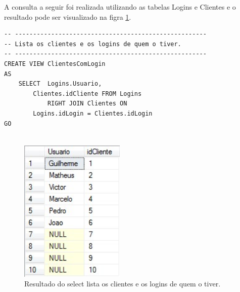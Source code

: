 \documentclass[
	12pt,				%
	openright,			%
	oneside,			%
	a4paper,			%
	chapter=TITLE,		%
	section=TITLE,		%
	english,			%
	brazil				%
	]{abntex2}
\begin{document}
    A consulta a seguir foi realizada utilizando as tabelas Logins e Clientes  
    e o resultado pode ser visualizado na figra \ref{select03}.
    \begin{lstlisting}
-- -----------------------------------------------------
-- Lista os clientes e os logins de quem o tiver.
-- -----------------------------------------------------
CREATE VIEW ClientesComLogin
AS
	SELECT  Logins.Usuario, 
    	Clientes.idCliente FROM Logins
	    	RIGHT JOIN Clientes ON 
    	Logins.idLogin = Clientes.idLogin 
GO
    
    \end{lstlisting}
    \begin{figure}[h]
         \centering
         \includegraphics[width=5cm,keepaspectratio]{Imgs/Select_003}
         \caption{Resultado do select lista os clientes e os logins de quem o tiver.}
         \label{select03}
    \end{figure}
    
    \newpage
    
\end{document}
